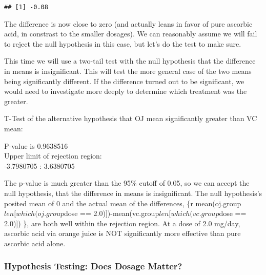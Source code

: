 \documentclass[]{article}
\newenvironment{Shaded}{\begin{snugshade}}{\end{snugshade}}
\newcommand{\KeywordTok}[1]{\textcolor[rgb]{0.13,0.29,0.53}{\textbf{#1}}}
\newcommand{\FloatTok}[1]{\textcolor[rgb]{0.00,0.00,0.81}{#1}}
\newcommand{\StringTok}[1]{\textcolor[rgb]{0.31,0.60,0.02}{#1}}
\newcommand{\OperatorTok}[1]{\textcolor[rgb]{0.81,0.36,0.00}{\textbf{#1}}}
\newcommand{\NormalTok}[1]{#1}
\begin{document}
\begin{verbatim}
## [1] -0.08
\end{verbatim}

The difference is now close to zero (and actually leans in favor of pure
ascorbic acid, in constrast to the smaller dosages). We can reasonably
assume we will fail to reject the null hypothesis in this case, but
let's do the test to make sure.

This time we will use a two-tail test with the null hypothesis that the
difference in means is insignificant. This will test the more general
case of the two means being significantly different. If the difference
turned out to be significant, we would need to investigate more deeply
to determine which treatment was the greater.

T-Test of the alternative hypothesis that OJ mean significantly greater
than VC mean:

\begin{Shaded}
\end{Shaded}

P-value is 0.9638516\\
Upper limit of rejection region:\\
-3.7980705 : 3.6380705

The p-value is much greater than the 95\% cutoff of 0.05, so we can
accept the null hypothesis, that the difference in means is
insignificant. The null hypothesis's posited mean of 0 and the actual
mean of the differences, \{r mean(oj.group\(len[which(oj.group\)dose ==
2.0){]})-mean(vc.group\(len[which(vc.group\)dose == 2.0){]}) \}, are
both well within the rejection region. At a dose of 2.0 mg/day, ascorbic
acid via orange juice is NOT significantly more effective than pure
ascorbic acid alone.

\subsubsection{Hypothesis Testing: Does Dosage
Matter?}\label{hypothesis-testing-does-dosage-matter}
\end{document}

